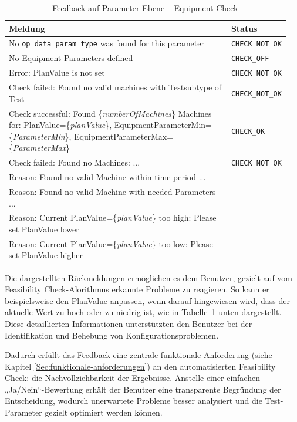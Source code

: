 \begin{table}[!htb]
    \centering
    \caption{Feedback auf Parameter-Ebene -- Equipment Check}
    \footnotesize
    \renewcommand{\arraystretch}{1.1}
    \begin{tabular}{p{0.8\linewidth} p{0.15\linewidth}}
        \textbf{Meldung} & \textbf{Status} \\
        \midrule
        No \texttt{op\_data\_param\_type} was found for this parameter & \texttt{CHECK\_NOT\_OK} \\
        \midrule
        No Equipment Parameters defined & \texttt{CHECK\_OFF} \\
        \midrule
        Error: PlanValue is not set & \texttt{CHECK\_NOT\_OK} \\
        \midrule
        Check failed: Found no valid machines with Testsubtype of Test & \texttt{CHECK\_NOT\_OK} \\
        \midrule
        Check successful: Found \{\textit{numberOfMachines}\} Machines for: PlanValue=\{\textit{planValue}\}, EquipmentParameterMin=\{\textit{ParameterMin}\}, EquipmentParameterMax=\{\textit{ParameterMax}\} & \texttt{CHECK\_OK} \\
        \midrule
        Check failed: Found no Machines: ... & \texttt{CHECK\_NOT\_OK} \\
        \quad Reason: Found no valid Machine within time period ... & \\
        \quad Reason: Found no valid Machine with needed Parameters ... & \\
        \quad Reason: Current PlanValue=\{\textit{planValue}\} too high: Please set PlanValue lower & \\
        \quad Reason: Current PlanValue=\{\textit{planValue}\} too low: Please set PlanValue higher & \\
        \bottomrule
    \end{tabular}
    \label{tab:feedback-equipment}
\end{table}



Die dargestellten Rückmeldungen ermöglichen es dem Benutzer, gezielt auf vom Feasibility Check-Alorithmus erkannte Probleme zu reagieren. So kann er beispielsweise den PlanValue anpassen, wenn darauf hingewiesen wird, dass der aktuelle Wert zu hoch oder zu niedrig ist, wie in Tabelle~\ref{tab:feedback-equipment} unten dargestellt. Diese detaillierten Informationen unterstützten den Benutzer bei der Identifikation und Behebung von Konfigurationsproblemen. 

Dadurch erfüllt das Feedback eine zentrale funktionale Anforderung (siehe Kapitel \ref{Sec:funktionale-anforderungen}) an den automatisierten Feasibility Check: die Nachvollziehbarkeit der Ergebnisse. Anstelle einer einfachen „Ja/Nein“-Bewertung erhält der Benutzer eine transparente Begründung der Entscheidung, wodurch unerwartete Probleme besser analysiert und die Test-Parameter gezielt optimiert werden können.